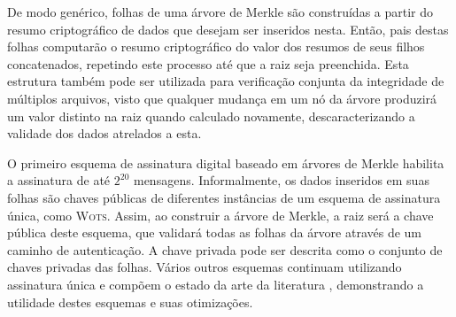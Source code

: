 \documentclass[12pt]{report}
\begin{document}
De modo genérico, folhas de uma árvore de Merkle são construídas a partir do resumo criptográfico de dados que desejam ser inseridos nesta. Então, pais destas folhas computarão o resumo criptográfico do valor dos resumos de seus filhos concatenados, repetindo este processo até que a raiz seja preenchida. Esta estrutura também pode ser utilizada para verificação conjunta da integridade de múltiplos arquivos, visto que qualquer mudança em um nó da árvore produzirá um valor distinto na raiz quando calculado novamente, descaracterizando a validade dos dados atrelados a esta.

O primeiro esquema de assinatura digital baseado em árvores de Merkle \cite{Merkle:1989:CDS:118209.118230} habilita a assinatura de até $2^{20}$ mensagens. Informalmente, os dados inseridos em suas folhas são chaves públicas de diferentes instâncias de um esquema de assinatura única, como \textsc{Wots}. Assim, ao construir a árvore de Merkle, a raiz será a chave pública deste esquema, que validará todas as folhas da árvore através de um caminho de autenticação. A chave privada pode ser descrita como o conjunto de chaves privadas das folhas. Vários outros esquemas continuam utilizando assinatura única e compõem o estado da arte da literatura \cite{sphincsplus,irtf-cfrg-xmss-hash-based-signatures-12}, demonstrando a utilidade destes esquemas e suas otimizações.



\end{document}
